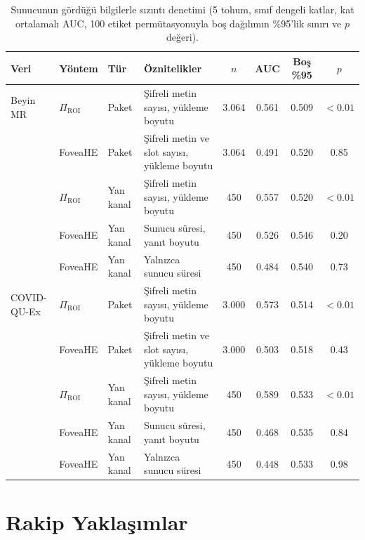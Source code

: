 \begin{table}[h!]
{\setlength{\tabcolsep}{3pt}
\caption{Sunucunun gördüğü bilgilerle sızıntı denetimi (5 tohum, sınıf dengeli katlar, kat ortalamalı AUC, 100 etiket permütasyonuyla boş dağılımın \%95'lik sınırı ve $p$ değeri).}
\begin{center}
\vspace{-6mm}
{\footnotesize
\begin{tabular}{lllp{3.6cm}cccc}
\hline\hline
Veri & Yöntem & Tür & Öznitelikler & $n$ & AUC & Boş \%95 & $p$ \\
\hline
Beyin MR & $\Pi_{\mathrm{ROI}}$ & Paket & Şifreli metin sayısı, yükleme boyutu & 3.064 & 0.561 & 0.509 & $<0.01$ \\
 & FoveaHE & Paket & Şifreli metin ve slot sayısı, yükleme boyutu & 3.064 & 0.491 & 0.520 & 0.85 \\
 & $\Pi_{\mathrm{ROI}}$ & Yan kanal & Şifreli metin sayısı, yükleme boyutu & 450 & 0.557 & 0.520 & $<0.01$ \\
 & FoveaHE & Yan kanal & Sunucu süresi, yanıt boyutu & 450 & 0.526 & 0.546 & 0.20 \\
 & FoveaHE & Yan kanal & Yalnızca sunucu süresi & 450 & 0.484 & 0.540 & 0.73 \\
\hline
COVID-QU-Ex & $\Pi_{\mathrm{ROI}}$ & Paket & Şifreli metin sayısı, yükleme boyutu & 3.000 & 0.573 & 0.514 & $<0.01$ \\
 & FoveaHE & Paket & Şifreli metin ve slot sayısı, yükleme boyutu & 3.000 & 0.503 & 0.518 & 0.43 \\
 & $\Pi_{\mathrm{ROI}}$ & Yan kanal & Şifreli metin sayısı, yükleme boyutu & 450 & 0.589 & 0.533 & $<0.01$ \\
 & FoveaHE & Yan kanal & Sunucu süresi, yanıt boyutu & 450 & 0.468 & 0.535 & 0.84 \\
 & FoveaHE & Yan kanal & Yalnızca sunucu süresi & 450 & 0.448 & 0.533 & 0.98 \\
\hline
\end{tabular}}
\vspace{-6mm}
\end{center}
\label{tbl:fovleak}}
\end{table}

\section{Rakip Yaklaşımlar}\label{sec:res:rivals}

